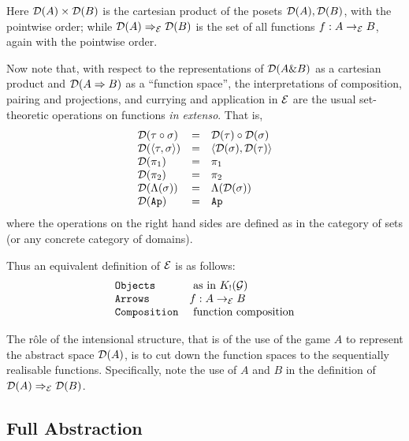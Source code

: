 \documentclass[11pt]{article}
\newcommand{\E}{{\cal E}}
\newcommand{\G}{{\cal G}}
\newcommand{\D}{{\cal D}}
\newcommand{\with}{\mbox{$\&$}}
\newcommand{\lang}{\langle}
\newcommand{\rang}{\rangle}
\begin{document}
Here $\D(A)\times\D(B)$ is the cartesian product of the posets $\D(A),\D(B)$,
with the pointwise order; while $\D(A)\Rightarrow_{\E} \D(B)$ is the set of
all functions $f:A\rightarrow_{\E} B$, again with the pointwise order.

Now note that, with respect to the representations of $\D(A\with B)$ as a
cartesian product and $\D(A\Rightarrow B)$ as a ``function space'', the
interpretations of composition, pairing and projections, and currying and
application in $\E$ are the usual set-theoretic operations on functions
{\em in extenso}. That is,
\[
\begin{array}{lcl}
\D(\tau\circ\sigma) & = & \D(\tau)\circ\D(\sigma) \\
\D(\lang \tau,\sigma\rang ) & = & \lang \D(\sigma),\D(\tau)\rang  \\
\D(\pi_1)  & = & \pi_1 \\
\D(\pi_2)  & = & \pi_2 \\
\D(\Lambda(\sigma))   & =& \Lambda(\D(\sigma)) \\
\D({\tt Ap})   & =& {\tt Ap}
\end{array} \]
\noindent where the operations on the right hand sides are defined as
in the category
of sets (or any concrete category of domains).

Thus an equivalent definition of $\E$ is as follows:
\[
\begin{array}{ll}
{\tt Objects} & \mbox{ as in } K_{!}(\G) \\
{\tt Arrows } & f : A\rightarrow_{\E} B\\
{\tt Composition } & \mbox{ function composition}
\end{array}\]

The r\^ole of the intensional structure, that is of the use of the game $A$
to represent the abstract space $\D(A)$, is to cut down the function spaces
to the sequentially realisable functions. Specifically, note the use of $A$
and $B$ in the definition of $\D(A)\Rightarrow_{\E} \D(B)$.

\subsection{Full Abstraction}
\end{document}
